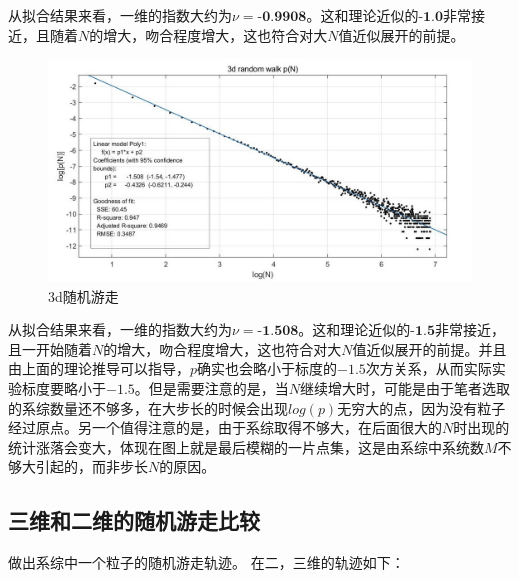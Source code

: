 \documentclass[UTF8]{ctexart}
\begin{document}
	
	\begin{flushleft}
		从拟合结果来看，一维的指数大约为$\nu=\textbf{-0.9908}$。这和理论近似的$\textbf{-1.0}$非常接近，且随着$N$的增大，吻合程度增大，这也符合对大$N$值近似展开的前提。
	\end{flushleft}
	
		\begin{figure}[H]
		\centering  %
		\includegraphics[width=6in]{../result_1/curve_3d.jpg}
		\caption{3d随机游走}
	\end{figure}
	
	\begin{flushleft}
		从拟合结果来看，一维的指数大约为$\nu=\textbf{-1.508}$。这和理论近似的$\textbf{-1.5}$非常接近，且一开始随着$N$的增大，吻合程度增大，这也符合对大$N$值近似展开的前提。并且由上面的理论推导可以指导，$p$确实也会略小于标度的$-1.5$次方关系，从而实际实验标度要略小于$-1.5$。但是需要注意的是，当$N$继续增大时，可能是由于笔者选取的系综数量还不够多，在大步长的时候会出现$log(p)$无穷大的点，因为没有粒子经过原点。另一个值得注意的是，由于系综取得不够大，在后面很大的$N$时出现的统计涨落会变大，体现在图上就是最后模糊的一片点集，这是由系综中系统数$M$不够大引起的，而非步长$N$的原因。
	\end{flushleft}
	
	\subsection{三维和二维的随机游走比较}
	
	做出系综中一个粒子的随机游走轨迹。
	在二，三维的轨迹如下：
	
\end{document}
